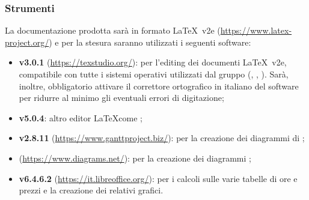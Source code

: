 	\subsubsection{Strumenti}
	La documentazione prodotta sarà in formato \LaTeX\ v2e (\url{https://www.latex-project.org/}) e per la stesura saranno utilizzati i seguenti software:	
	\begin{itemize}
		\item \textbf{ v3.0.1} (\url{https://texstudio.org/}): per l'editing dei documenti \LaTeX\ v2e, compatibile con tutte i sistemi operativi utilizzati dal gruppo (, , ). Sarà, inoltre, obbligatorio attivare il correttore ortografico in italiano del software per ridurre al minimo gli eventuali errori di digitazione;
		\item \textbf{ v5.0.4}: altro editor \LaTeX come ;
		\item \textbf{ v2.8.11} (\url{https://www.ganttproject.biz/}): per la creazione dei diagrammi di ;
		\item \textbf{} (\url{https://www.diagrams.net/}): per la creazione dei diagrammi ;
		\item \textbf{ v6.4.6.2} (\url{https://it.libreoffice.org/}): per i calcoli sulle varie tabelle di ore  e prezzi e la creazione dei relativi grafici.
	\end{itemize}

